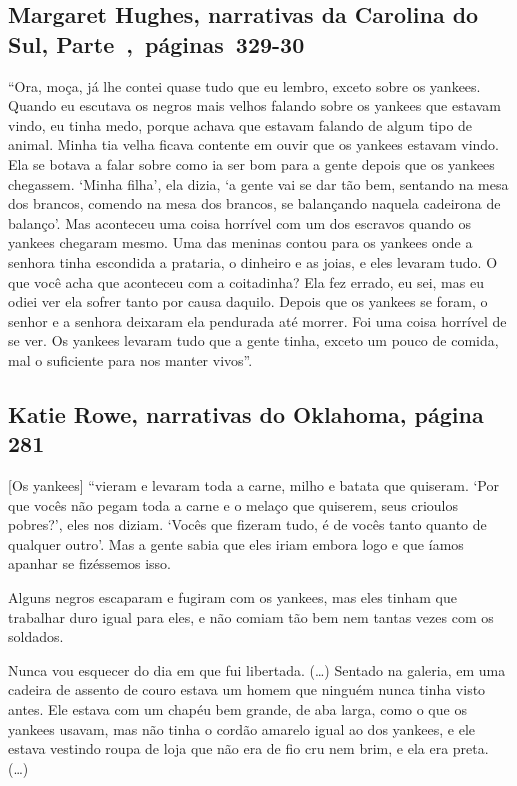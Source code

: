 \subsection{Margaret Hughes, narrativas da Carolina do Sul, Parte~,~páginas~329-30}
\label{ref155}

``Ora, moça, já lhe contei quase tudo que eu lembro, exceto sobre os
yankees. Quando eu escutava os negros mais velhos falando sobre os
yankees que estavam vindo, eu tinha medo, porque achava que estavam
falando de algum tipo de animal. Minha tia velha ficava contente em
ouvir que os yankees estavam vindo. Ela se botava a falar sobre como ia
ser bom para a gente depois que os yankees chegassem. `Minha filha', ela
dizia, `a gente vai se dar tão bem, sentando na mesa dos brancos,
comendo na mesa dos brancos, se balançando naquela cadeirona de
balanço'. Mas aconteceu uma coisa horrível com um dos escravos quando os
yankees chegaram mesmo. Uma das meninas contou para os yankees onde a
senhora tinha escondida a prataria, o dinheiro e as joias, e eles
levaram tudo. O que você acha que aconteceu com a coitadinha? Ela fez
errado, eu sei, mas eu odiei ver ela sofrer tanto por causa daquilo.
Depois que os yankees se foram, o senhor e a senhora deixaram ela
pendurada até morrer. Foi uma coisa horrível de se ver. Os yankees
levaram tudo que a gente tinha, exceto um pouco de comida, mal o
suficiente para nos manter vivos''.

\subsection{Katie Rowe, narrativas do Oklahoma, página 281}
\label{ref233}

{[}Os yankees{]} ``vieram e levaram toda a carne, milho e batata que
quiseram. `Por que vocês não pegam toda a carne e o melaço que quiserem,
seus crioulos pobres?', eles nos diziam. `Vocês que fizeram tudo, é de
vocês tanto quanto de qualquer outro'. Mas a gente sabia que eles iriam
embora logo e que íamos apanhar se fizéssemos isso.

Alguns negros escaparam e fugiram com os yankees, mas eles tinham que
trabalhar duro igual para eles, e não comiam tão bem nem tantas vezes
com os soldados.

Nunca vou esquecer do dia em que fui libertada. (\ldots{}) Sentado na
galeria, em uma cadeira de assento de couro estava um homem que ninguém
nunca tinha visto antes. Ele estava com um chapéu bem grande, de aba
larga, como o que os yankees usavam, mas não tinha o cordão amarelo
igual ao dos yankees, e ele estava vestindo roupa de loja que não era de
fio cru nem brim, e ela era preta. (\ldots{})

